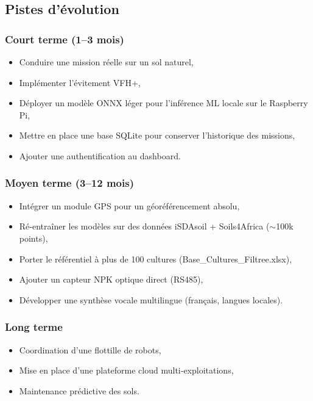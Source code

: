 \documentclass[a4paper,12pt,openany,titlepage]{scrartcl}
\begin{document}
\subsection{Pistes d’évolution}

\subsubsection{Court terme (1--3 mois)}
\begin{itemize}[nosep]
    \item Conduire une mission réelle sur un sol naturel,
    \item Implémenter l’évitement VFH+,
    \item Déployer un modèle ONNX léger pour l’inférence ML locale sur le Raspberry Pi,
    \item Mettre en place une base SQLite pour conserver l’historique des missions,
    \item Ajouter une authentification au dashboard.
\end{itemize}

\subsubsection{Moyen terme (3--12 mois)}
\begin{itemize}[nosep]
    \item Intégrer un module GPS pour un géoréférencement absolu,
    \item Ré‑entraîner les modèles sur des données iSDAsoil + Soils4Africa ($\sim$100k points),
    \item Porter le référentiel à plus de 100 cultures (Base\_Cultures\_Filtree.xlsx),
    \item Ajouter un capteur NPK optique direct (RS485),
    \item Développer une synthèse vocale multilingue (français, langues locales).
\end{itemize}

\subsubsection{Long terme}
\begin{itemize}[nosep]
    \item Coordination d’une flottille de robots,
    \item Mise en place d’une plateforme cloud multi‑exploitations,
    \item Maintenance prédictive des sols.
\end{itemize}
\end{document}
